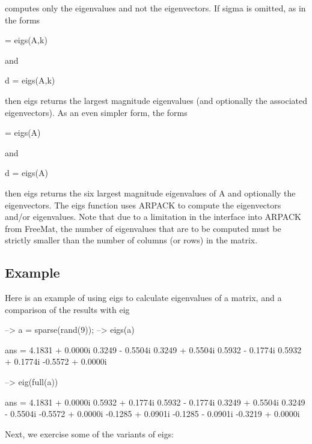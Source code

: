  computes only the eigenvalues and not the eigenvectors. If {\ttfamily sigma} is omitted, as in the forms \begin{DoxyVerb}  [V,D] = eigs(A,k)
\end{DoxyVerb}
 and \begin{DoxyVerb}  d = eigs(A,k)
\end{DoxyVerb}
 then {\ttfamily eigs} returns the largest magnitude eigenvalues (and optionally the associated eigenvectors). As an even simpler form, the forms \begin{DoxyVerb}  [V,D] = eigs(A)
\end{DoxyVerb}
 and \begin{DoxyVerb}  d = eigs(A)
\end{DoxyVerb}
 then {\ttfamily eigs} returns the six largest magnitude eigenvalues of {\ttfamily A} and optionally the eigenvectors. The {\ttfamily eigs} function uses A\-R\-P\-A\-C\-K to compute the eigenvectors and/or eigenvalues. Note that due to a limitation in the interface into A\-R\-P\-A\-C\-K from Free\-Mat, the number of eigenvalues that are to be computed must be strictly smaller than the number of columns (or rows) in the matrix. \hypertarget{variables_struct_Example}{}\subsection{Example}\label{variables_struct_Example}
Here is an example of using {\ttfamily eigs} to calculate eigenvalues of a matrix, and a comparison of the results with {\ttfamily eig}


\begin{DoxyVerbInclude}
--> a = sparse(rand(9));
--> eigs(a)

ans = 
   4.1831 +  0.0000i 
   0.3249 -  0.5504i 
   0.3249 +  0.5504i 
   0.5932 -  0.1774i 
   0.5932 +  0.1774i 
  -0.5572 +  0.0000i 

--> eig(full(a))

ans = 
   4.1831 +  0.0000i 
   0.5932 +  0.1774i 
   0.5932 -  0.1774i 
   0.3249 +  0.5504i 
   0.3249 -  0.5504i 
  -0.5572 +  0.0000i 
  -0.1285 +  0.0901i 
  -0.1285 -  0.0901i 
  -0.3219 +  0.0000i 
\end{DoxyVerbInclude}


Next, we exercise some of the variants of {\ttfamily eigs}\-:


